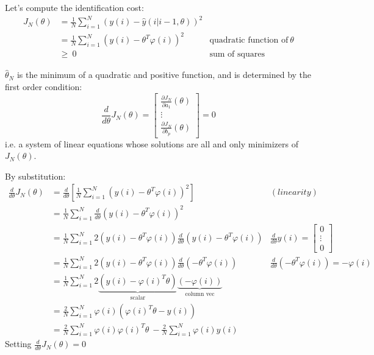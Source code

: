 Let's compute the identification cost:		
\begin{align*}
J_{N}( \theta ) & =\frac{1}{N}\sum _{i=1}^{N}( y( i) -\hat{y}( i|i-1,\theta ))^{2} & \\
 & =\frac{1}{N}\sum _{i=1}^{N}\left( y( i) -\theta ^{T} \varphi ( i)\right)^{2} & \text{quadratic function of} \ \theta \\
 & \geq \ 0 & \text{sum of squares}
\end{align*}


$ \hat{\theta }_{N}$ is the minimum of a quadratic and positive function, and is determined by the first order condition:
\begin{equation*}
\frac{d}{d\theta } J_{N}( \theta ) =\begin{bmatrix}
\frac{\partial J_{N}}{\partial a_{1}}( \theta )\\
\vdots \\
\frac{\partial J_{N}}{\partial b_{p}}( \theta )
\end{bmatrix} =0
\end{equation*}
i.e. a system of linear equations whose solutions are all and only minimizers of $ J_{N}( \theta )$.

By substitution:
\begin{equation*}
\begin{aligned}
\frac{d}{d\theta } J_{N}( \theta ) & =\frac{d}{d\theta }[\frac{1}{N}\sum _{i=1}^{N}\left( y( i) -\theta ^{T} \varphi ( i)\right)^{2}] & ( linearity)\\
 & =\frac{1}{N}\sum _{i=1}^{N}\frac{d}{d\theta }\left( y( i) -\theta ^{T} \varphi ( i)\right)^{2} & \\
 & =\frac{1}{N}\sum _{i=1}^{N} 2\left( y( i) -\theta ^{T} \varphi ( i)\right)\frac{d}{d\theta }\left( y( i) -\theta ^{T} \varphi ( i)\right) & \frac{d}{d\theta } y( i) =\begin{bmatrix}
0\\
\vdots \\
0
\end{bmatrix}\\
 & =\frac{1}{N}\sum _{i=1}^{N} 2\left( y( i) -\theta ^{T} \varphi ( i)\right)\frac{d}{d\theta }\left( -\theta ^{T} \varphi ( i)\right) & \frac{d}{d\theta }\left( -\theta ^{T} \varphi ( i)\right) =-\varphi ( i)\\
 & =\frac{1}{N}\sum _{i=1}^{N} 2\underbrace{\left( y( i) -\varphi ( i)^{T} \theta \right)}_{\text{scalar}}\underbrace{( -\varphi ( i))}_{\text{column vec}} & \\
 & =\frac{2}{N}\sum _{i=1}^{N} \varphi ( i)\left( \varphi ( i)^{T} \theta -y( i)\right) & \\
 & =\frac{2}{N}\sum _{i=1}^{N} \varphi ( i) \varphi ( i)^{T} \theta \ -\frac{2}{N}\sum _{i=1}^{N} \varphi ( i) y( i) & 
\end{aligned} \ 
\end{equation*}
Setting $ \frac{d}{d\theta } J_{N}( \theta ) =0$	



